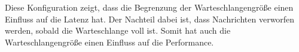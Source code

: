Diese Konfiguration zeigt, dass die Begrenzung der Warteschlangengröße einen Einfluss auf die Latenz hat. Der Nachteil dabei ist, dass Nachrichten verworfen werden, sobald die Warteschlange voll ist. Somit hat auch die Warteschlangengröße einen Einfluss auf die Performance. 






